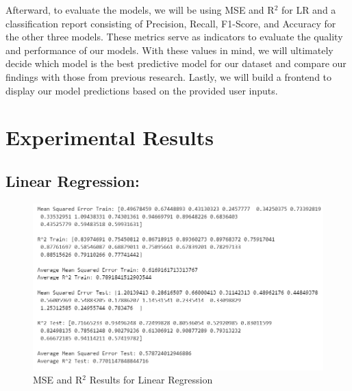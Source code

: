 \documentclass[11pt, letterpaper]{article}
\begin{document}
    \noindent Afterward, to evaluate the models, we will be using MSE and R$^2$ for LR and a classification report consisting of Precision, Recall, F1-Score, and Accuracy for the other three models. These metrics serve as indicators to evaluate the quality and performance of our models. With these values in mind, we will ultimately decide which model is the best predictive model for our dataset and compare our findings with those from previous research. Lastly, we will build a frontend to display our model predictions based on the provided user inputs.
    
    \section*{Experimental Results}

    \noindent\subsection*{Linear Regression:}

    \begin{figure}[H]
        \centering
        \includegraphics[width=\columnwidth]{lr-report.png}
        \caption{MSE and R$^2$ Results for Linear Regression}
        \label{fig:class-report-lr}
    \end{figure}
\end{document}
